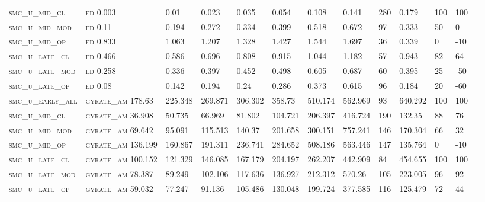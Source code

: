 \begin{landscape}
\begin{center}
\begin{footnotesize}
\begin{longtable}{lllllllllllll}
\textsc{smc\_u\_mid\_cl   } & \textsc{ed        }   0.003    & 0.01     & 0.023    & 0.035    & 0.054    & 0.108    & 0.141    & 280  & 0.179    & 100 & 100  \\
\textsc{smc\_u\_mid\_mod  } & \textsc{ed        }   0.11     & 0.194    & 0.272    & 0.334    & 0.399    & 0.518    & 0.672    & 97   & 0.333    & 50  & 0    \\
\textsc{smc\_u\_mid\_op   } & \textsc{ed        }   0.833    & 1.063    & 1.207    & 1.328    & 1.427    & 1.544    & 1.697    & 36   & 0.339    & 0   & -10  \\
\textsc{smc\_u\_late\_cl  } & \textsc{ed        }   0.466    & 0.586    & 0.696    & 0.808    & 0.915    & 1.044    & 1.182    & 57   & 0.943    & 82  & 64   \\
\textsc{smc\_u\_late\_mod } & \textsc{ed        }   0.258    & 0.336    & 0.397    & 0.452    & 0.498    & 0.605    & 0.687    & 60   & 0.395    & 25  & -50  \\
\textsc{smc\_u\_late\_op  } & \textsc{ed        }   0.08     & 0.142    & 0.194    & 0.24     & 0.286    & 0.373    & 0.615    & 96   & 0.184    & 20  & -60  \\
\textsc{smc\_u\_early\_all} & \textsc{gyrate\_am}   178.63   & 225.348  & 269.871  & 306.302  & 358.73   & 510.174  & 562.969  & 93   & 640.292  & 100 & 100  \\
\textsc{smc\_u\_mid\_cl   } & \textsc{gyrate\_am}   36.908   & 50.735   & 66.969   & 81.802   & 104.721  & 206.397  & 416.724  & 190  & 132.35   & 88  & 76   \\
\textsc{smc\_u\_mid\_mod  } & \textsc{gyrate\_am}   69.642   & 95.091   & 115.513  & 140.37   & 201.658  & 300.151  & 757.241  & 146  & 170.304  & 66  & 32   \\
\textsc{smc\_u\_mid\_op   } & \textsc{gyrate\_am}   136.199  & 160.867  & 191.311  & 236.741  & 284.652  & 508.186  & 563.446  & 147  & 135.764  & 0   & -10  \\
\textsc{smc\_u\_late\_cl  } & \textsc{gyrate\_am}   100.152  & 121.329  & 146.085  & 167.179  & 204.197  & 262.207  & 442.909  & 84   & 454.655  & 100 & 100  \\
\textsc{smc\_u\_late\_mod } & \textsc{gyrate\_am}   78.387   & 89.249   & 102.106  & 117.636  & 136.927  & 212.312  & 570.26   & 105  & 223.005  & 96  & 92   \\
\textsc{smc\_u\_late\_op  } & \textsc{gyrate\_am}   59.032   & 77.247   & 91.136   & 105.486  & 130.048  & 199.724  & 377.585  & 116  & 125.479  & 72  & 44   \\

\end{longtable}
\end{footnotesize}
\end{center}
\end{landscape}
